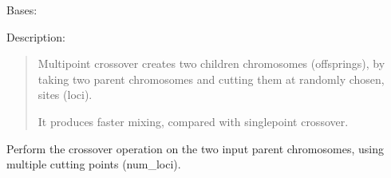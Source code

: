 \documentclass[letterpaper,10pt,english]{sphinxmanual}
\begin{document}
\begin{fulllineitems}
\label{\detokenize{pygenalgo.operators.crossover:pygenalgo.operators.crossover.mutli_point_crossover.MultiPointCrossover}}
\pysigstartsignatures
\pysiglinewithargsret
{}
{\sphinxparamcomma {}}
{}
\pysigstopsignatures
\sphinxAtStartPar
Bases: {\hyperref[\detokenize{pygenalgo.operators.crossover:pygenalgo.operators.crossover.crossover_operator.CrossoverOperator}]{}}

\sphinxAtStartPar
Description:
\begin{quote}

\sphinxAtStartPar
Multipoint crossover creates two children chromosomes (offsprings),
by taking two parent chromosomes and cutting them at randomly chosen,
sites (loci).

\sphinxAtStartPar
It produces faster mixing, compared with single\sphinxhyphen{}point crossover.
\end{quote}

\begin{fulllineitems}
\label{\detokenize{pygenalgo.operators.crossover:pygenalgo.operators.crossover.mutli_point_crossover.MultiPointCrossover.crossover}}
\pysigstartsignatures
\pysiglinewithargsret
{}
{\sphinxparamcomma {}}
{}
\pysigstopsignatures
\sphinxAtStartPar
Perform the crossover operation on the two input parent
chromosomes, using multiple cutting points (num\_loci).


\end{fulllineitems}
\end{fulllineitems}
\end{document}
